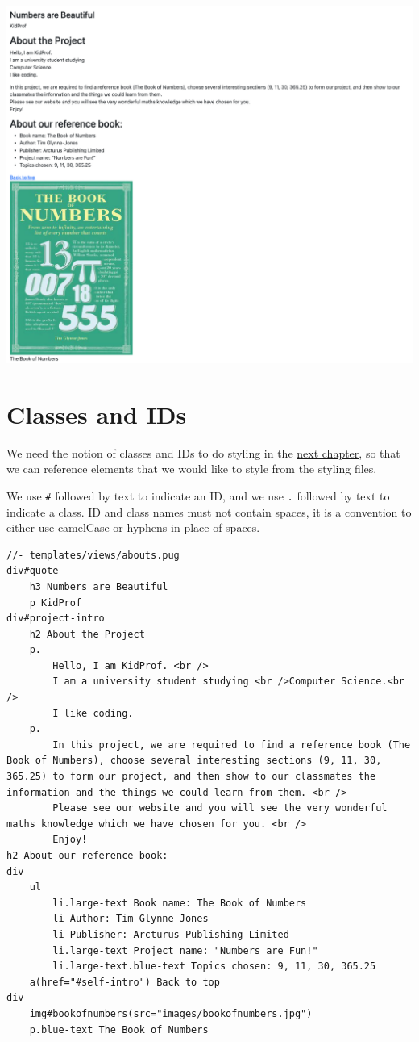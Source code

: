 \includegraphics[width=15cm]{images/ch5-finalproduct.png}

\section{Classes and IDs}
\label{sec:classesids}

We need the notion of classes and IDs to do styling in the \hyperref[sec:ch6]{next chapter}, so that we can reference elements that we would like to style from the styling files.

We use \texttt{\#} followed by text to indicate an ID, and we use \texttt{.} followed by text to indicate a class. ID and class names must not contain spaces, it is a convention to either use camelCase or hyphens in place of spaces.
\vspace{6mm}

\begin{lstlisting}[language=pug]
//- templates/views/abouts.pug
div#quote
    h3 Numbers are Beautiful
    p KidProf
div#project-intro
    h2 About the Project
    p.
	    Hello, I am KidProf. <br />
	    I am a university student studying <br />Computer Science.<br />
	    I like coding.
    p.
        In this project, we are required to find a reference book (The Book of Numbers), choose several interesting sections (9, 11, 30, 365.25) to form our project, and then show to our classmates the information and the things we could learn from them. <br />
        Please see our website and you will see the very wonderful maths knowledge which we have chosen for you. <br />
        Enjoy!
h2 About our reference book:
div
    ul
        li.large-text Book name: The Book of Numbers
        li Author: Tim Glynne-Jones
        li Publisher: Arcturus Publishing Limited
        li.large-text Project name: "Numbers are Fun!"
        li.large-text.blue-text Topics chosen: 9, 11, 30, 365.25
    a(href="#self-intro") Back to top
div
    img#bookofnumbers(src="images/bookofnumbers.jpg")
    p.blue-text The Book of Numbers
\end{lstlisting}

